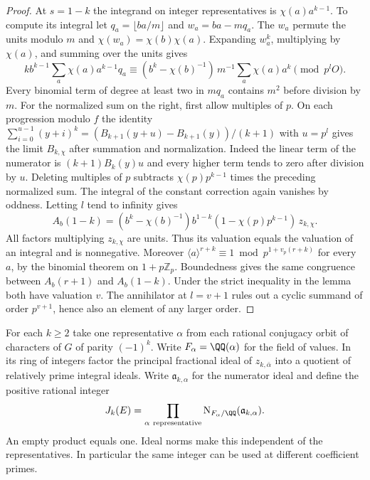 \documentclass[a4paper,11pt]{article}
\theoremstyle{definition}
\theoremstyle{remark}
\newcommand{\ZZ}{\mathbb Z}\newcommand{\ord}{\operatorname{ord}}
\numberwithin{equation}{section}
\begin{document}
\begin{proof}
At \(s=1-k\) the integrand on integer representatives is
\(\chi(a)a^{k-1}\). To compute its integral let
\(q_a=\lfloor ba/m\rfloor\) and \(w_a=ba-mq_a\). The \(w_a\)
permute the units modulo \(m\) and \(\chi(w_a)=\chi(b)\chi(a)\).
Expanding \(w_a^k\), multiplying by \(\chi(a)\), and summing
over the units gives
\[
 k b^{k-1}\sum_a\chi(a)a^{k-1}q_a
  \equiv(b^k-\chi(b)^{-1})\,m^{-1}\sum_a\chi(a)a^k\pmod{p^lO}.
\]
Every binomial term of degree at least two in \(mq_a\) contains
\(m^2\) before division by \(m\). For the normalized sum on the
right, first allow multiples of \(p\). On each progression modulo
\(f\) the identity
\(\sum_{i=0}^{u-1}(y+i)^k=(B_{k+1}(y+u)-B_{k+1}(y))/(k+1)\)
with \(u=p^l\) gives the limit \(B_{k,\chi}\) after summation
and normalization. Indeed the linear term of the numerator is
\((k+1)B_k(y)u\) and every higher term tends to zero after
division by \(u\). Deleting multiples of \(p\) subtracts
\(\chi(p)p^{k-1}\) times the preceding normalized sum.
The integral of the constant correction again vanishes by oddness.
Letting \(l\) tend to infinity gives
\begin{equation}
 A_b(1-k)=(b^k-\chi(b)^{-1})b^{1-k}
           (1-\chi(p)p^{k-1})\, z_{k,\chi}.
 \label{eq:value201}
\end{equation}
All factors multiplying \(z_{k,\chi}\) are units. Thus its
valuation equals the valuation
of an integral and is nonnegative. Moreover
\(\langle a\rangle^{r+k}\equiv1\bmod p^{1+v_p(r+k)}\) for every
\(a\), by the binomial theorem on \(1+p\ZZ_p\). Boundedness gives
the same congruence between \(A_b(r+1)\) and \(A_b(1-k)\).
Under the strict inequality in the lemma both have valuation \(v\).
The annihilator at \(l=v+1\) rules out a cyclic summand of order
\(p^{v+1}\), hence also an element of any larger order.
\end{proof}

For each \(k\ge2\) take one representative \(\alpha\) from each
rational conjugacy orbit of characters of \(G\) of parity
\((-1)^k\). Write \(F_\alpha=\QQ(\alpha)\) for the field of values.
In its ring of integers factor the principal fractional ideal
of \(z_{k,\bar\alpha}\) into a quotient of relatively prime
integral ideals. Write \(\mathfrak a_{k,\alpha}\) for the numerator
ideal and define the positive rational integer
\begin{equation}
 J_k(E)=\prod_{\alpha\ {\rm representative}}
                \mathrm N_{F_\alpha/\QQ}(\mathfrak a_{k,\alpha}).
 \label{eq:int201}
\end{equation}
An empty product equals one. Ideal norms make this independent of
the representatives. In particular the same integer can be used
at different coefficient primes.
\end{document}
